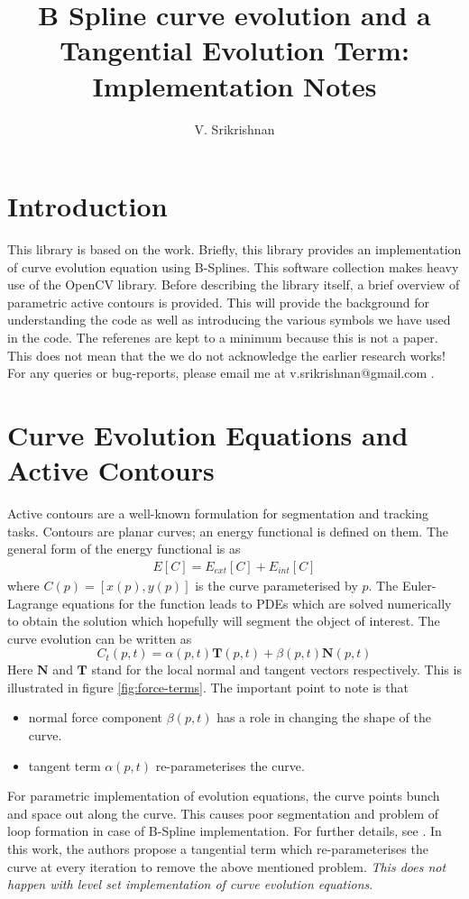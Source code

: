 \documentclass[12pt,a4paper]{article}
\author{V. Srikrishnan}
\title{B Spline curve evolution and a Tangential
  Evolution Term: Implementation Notes}
\begin{document}
\maketitle
\section{Introduction}
This library is based on the work\cite{tangent-term}. Briefly, this
library provides an implementation of curve evolution equation using
B-Splines. This software collection makes heavy use of the
OpenCV\cite{opencv} library. Before describing the library itself, a
brief overview of parametric active contours is provided. This will
provide the background for understanding the code as well as
introducing the various symbols we have used in the code. The
referenes are kept to a minimum because this is not a
paper. This does not mean that the we do not acknowledge the earlier
research works! For any queries or bug-reports, please email
me at v.srikrishnan@gmail.com .
\section{Curve Evolution Equations and Active Contours}
Active contours are a well-known formulation for segmentation and
tracking tasks. Contours are planar curves; an energy functional is
defined on them. The general form of the energy functional is as 
\begin{align}\label{eq:energy}
E[C] = E_{ext}[C] + E_{int}[C]
\end{align}
where $C(p) = [x(p), y(p)]$ is the curve parameterised by $p$. The
Euler-Lagrange equations for the function leads to PDEs which are
solved numerically to obtain the solution which hopefully will segment
the object of interest. The curve evolution can be written as
\begin{equation}\label{eq:evoluton-eqn}
C_t(p,t) = \alpha(p,t) \mathbf{T}(p,t) + \beta (p, t) \mathbf{N}(p,t)
\end{equation}
Here $\mathbf{N}$ and $\mathbf{T}$ stand for the local normal and
tangent vectors respectively. This is illustrated in figure
\ref{fig:force-terms}. The important point to note is that 
\begin{itemize}
\item normal force component $\beta (p,t)$ has a role in changing the
  shape of the curve. 
\item tangent term $\alpha (p,t)$ re-parameterises the curve.
\end{itemize}
For parametric implementation of evolution equations, the curve points
bunch and space out along the curve. This causes poor segmentation and
problem of loop formation in case of B-Spline implementation. For
further details, see \cite{tangent-term}. In this work, the authors
propose a tangential term which re-parameterises the curve at every
iteration to remove the above mentioned problem. 
\emph{This does not happen with level set implementation of curve
  evolution equations}. 
\end{document}
